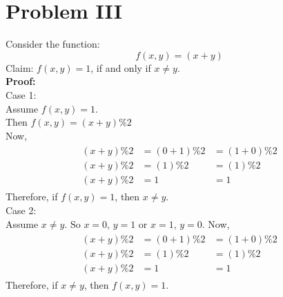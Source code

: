 \documentclass{book}
\begin{document}
\vspace{1em}

\section{Problem III}
Consider the function:
\begin{equation*}
    f(x, y) = (x + y) %
\end{equation*}
Claim: $f(x, y) = 1$, if and only if $x \not= y$. \\

\textbf{Proof:} \\
Case 1: \\
Assume $f(x, y) = 1$. \\
Then $f(x, y) = (x + y) \% 2$ \\
Now, \begin{multline} \label{eq5}
    \begin{split}
        (x + y) \% 2 &= (0 + 1) \% 2 &= (1 + 0) \% 2 \\
        (x + y) \% 2 &= (1) \% 2     &= (1) \% 2 \\
        (x + y) \% 2 &= 1            &= 1
    \end{split}
\end{multline}
Therefore, if $f(x, y) = 1$, then $x \not= y$. \\

Case 2: \\
Assume $x \not= y$.
So $x = 0$, $y = 1$ or $x = 1$, $y = 0$.
Now, \begin{multline} \label{eq6}
    \begin{split}
        (x + y) \% 2 &= (0 + 1) \% 2 &= (1 + 0) \% 2 \\
        (x + y) \% 2 &= (1) \% 2     &= (1) \% 2 \\
        (x + y) \% 2 &= 1            &= 1
    \end{split}
\end{multline}
Therefore, if $x \not= y$, then $f(x, y) =1$. \\

\vspace{1em}
\end{document}
